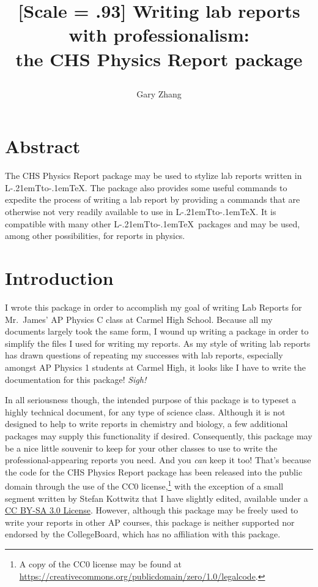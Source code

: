 \documentclass[12pt]{ltxdoc}
\title{\hspace*{-3.25cm}\parbox{\textwidth + 6.5cm}{\centering\fontspec{Latin Modern Roman}[Scale = .93] Writing lab reports with professionalism:\\the CHS Physics Report package}\vspace{2mm}}\makeatletter
\author{Gary Zhang\footnoteDuplic@teDuplic@te{\sffamily Correspondence may be sent to \texttt{garyzhang00 \char`\$\char`\@\char`\$\  gmail.com}}}
\makeatletter
\def\LaTeX{ L\kern -.21em{\sbox \z@ T\vbox to\ht \z@ {\hbox {\check@mathfonts \fontsize \sf@size \z@ \math@fontsfalse \selectfont A}\vss }}\kern -.1em\TeX}%
\makeatother
\begin{document}
\maketitle\vspace{13mm}
\sffamily

\section{Abstract}


The CHS Physics Report package may be used to stylize lab reports written in \LaTeX. The package also provides some useful commands to expedite the process of writing a lab report by providing a commands that are otherwise not very readily available to use in \LaTeX. It is compatible with many other \LaTeX\ packages and may be used, among other possibilities, for reports in physics.

\section{Introduction}

I wrote this package in order to accomplish my goal of writing Lab Reports for Mr.\ James' AP Physics C class at Carmel High School. Because all my documents largely took the same form, I wound up writing a package in order to simplify the files I used for writing my reports. As my style of writing lab reports has drawn questions of repeating my successes with lab reports, especially amongst AP Physics 1 students at Carmel High, it looks like I have to write the documentation for this package! \emph{Sigh!}

In all seriousness though, the intended purpose of this package is to typeset a highly technical document, for any type of science class. Although it is not designed to help to write reports in chemistry and biology, a few additional packages may supply this functionality if desired. Consequently, this package may be a nice little souvenir to keep for your other classes to use to write the professional-appearing reports you need. And you \emph{can} keep it too! That's because the code for the CHS Physics Report package has been released into the public domain through the use of the CC0 license,\footnote{\sffamily A copy of the CC0 license may be found at\\ \url{https://creativecommons.org/publicdomain/zero/1.0/legalcode}.} with the exception of a small segment written by Stefan Kottwitz that I have slightly edited, available under a \href{https://creativecommons.org/licenses/by-sa/3.0/legalcode}{CC BY-SA 3.0 License}. However, although this package may be freely used to write your reports in other AP courses, this package is neither supported nor endorsed by the CollegeBoard, which has no affiliation with this package.
\end{document}
